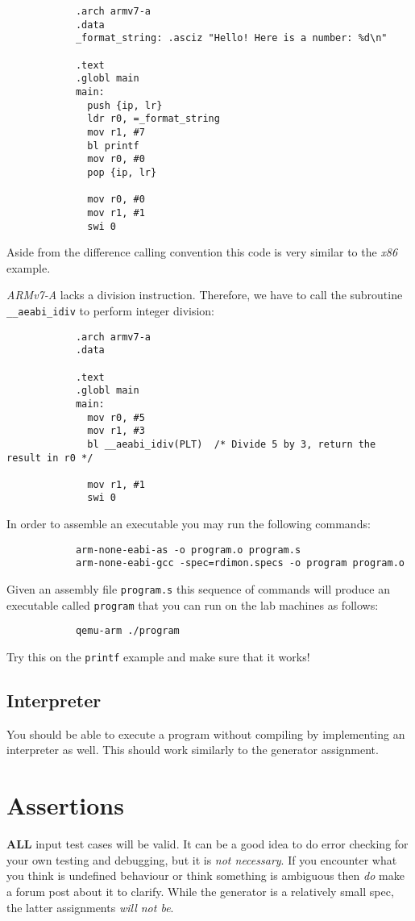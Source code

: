 \documentclass{article}
\begin{document}
		\begin{lstlisting}
			.arch armv7-a
			.data
			_format_string: .asciz "Hello! Here is a number: %d\n"

			.text
			.globl main
			main:
			  push {ip, lr}
			  ldr r0, =_format_string
			  mov r1, #7
			  bl printf
			  mov r0, #0
			  pop {ip, lr}

			  mov r0, #0
			  mov r1, #1
			  swi 0
		\end{lstlisting}

		Aside from the difference calling convention this code is very similar to the \textit{x86} example.

		\textit{ARMv7-A} lacks a division instruction. Therefore, we have to call the subroutine
		\texttt{\_\_aeabi\_idiv} to perform integer division:

		\begin{lstlisting}
			.arch armv7-a
			.data

			.text
			.globl main
			main:
			  mov r0, #5
			  mov r1, #3
			  bl __aeabi_idiv(PLT)  /* Divide 5 by 3, return the result in r0 */

			  mov r1, #1
			  swi 0
		\end{lstlisting}

		In order to assemble an executable you may run the following commands:

		\begin{lstlisting}
			arm-none-eabi-as -o program.o program.s
			arm-none-eabi-gcc -spec=rdimon.specs -o program program.o
		\end{lstlisting}

		Given an assembly file \texttt{program.s} this sequence of commands will produce an executable called
		\texttt{program} that you can run on the lab machines as follows:

		\begin{lstlisting}
			qemu-arm ./program
		\end{lstlisting}

		Try this on the \texttt{printf} example and make sure that it works!


	\subsection{Interpreter}

		You should be able to execute a program without compiling by implementing an interpreter as well. This should
		work similarly to the generator assignment.

\section{Assertions}
\textbf{ALL} input test cases will be valid. It can be a good idea to do error checking for your
own testing and debugging, but it is \textit{not necessary}. If you encounter what you think is
undefined behaviour or think something is ambiguous then \textit{do} make a forum post about it to
clarify. While the generator is a relatively small spec, the latter assignments \textit{will not
be}.
\end{document}
